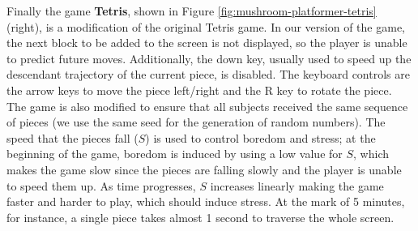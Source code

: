 Finally the game \textbf{Tetris}, shown in Figure \ref{fig:mushroom-platformer-tetris} (right), is a modification of the original Tetris game. In our version of the game, the next block to be added to the screen is not displayed, so the player is unable to predict future moves. Additionally, the down key, usually used to speed up the descendant trajectory of the current piece, is disabled. The keyboard controls are the arrow keys to move the piece left/right and the R key to rotate the piece. The game is also modified to ensure that all subjects received the same sequence of pieces (we use the same seed for the generation of random numbers). The speed that the pieces fall ($S$) is used to control boredom and stress; at the beginning of the game, boredom is induced by using a low value for $S$, which makes the game slow since the pieces are falling slowly and the player is unable to speed them up. As time progresses, $S$ increases linearly making the game faster and harder to play, which should induce stress. At the mark of 5 minutes, for instance, a single piece takes almost 1 second to traverse the whole screen.







